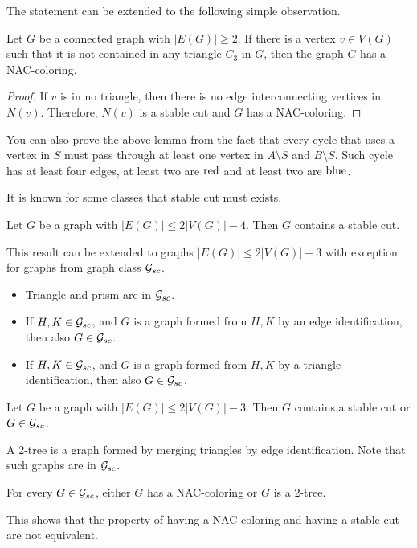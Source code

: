 The statement can be extended to the following simple observation.
%
\begin{corollary}
	Let \( G \) be a connected graph with \( |E(G)| \ge 2 \).
	If there is a vertex \( v \in V(G) \) such that it is
	not contained in any triangle \( C_3 \) in \( G \),
	then the graph \( G \) has a NAC-coloring.
\end{corollary}
%
\begin{proof}
	If \( v \) is in no triangle, then there is no edge interconnecting
	vertices in \( N(v) \). Therefore, \( N(v) \) is a stable cut and \( G \)
	has a NAC-coloring.
\end{proof}

You can also prove the above lemma from the fact that every cycle that
uses a vertex in \( S \) must pass
through at least one vertex in \( A \setminus S \) and \( B \setminus S \).
Such cycle has at least four edges,
at least two are \( \text{red} \) and at least two are \( \text{blue} \).

It is known for some classes that stable cut must exists.
%
\begin{theorem}
	Let \( G \) be a graph with \( |E(G)| \le 2|V(G)|-4 \).
	Then \( G \) contains a stable cut.
\end{theorem}
%
This result can be extended to graphs \( |E(G)| \le 2|V(G)|-3 \) with exception
for graphs from graph class \( \mathcal{G}_{sc} \).
%
\begin{itemize}
	\item Triangle and prism are in \( \mathcal{G}_{sc} \).
	\item If \( H, K \in \mathcal{G}_{sc} \), and \( G \) is a graph
	      formed from \( H, K \) by an edge identification,
	      then also \( G \in \mathcal{G}_{sc} \).
	\item If \( H, K \in \mathcal{G}_{sc} \), and \( G \) is a graph
	      formed from \( H, K \) by a triangle identification,
	      then also \( G \in \mathcal{G}_{sc} \).
\end{itemize}
%
%
\begin{theorem}
	Let \( G \) be a graph with \( |E(G)| \le 2|V(G)|-3 \). Then \( G \) contains
	a stable cut or \( G \in \mathcal{G}_{sc} \).
\end{theorem}
%
A 2-tree is a graph formed by merging triangles by edge identification.
Note that such graphs are in \( \mathcal{G}_{sc} \).
%
\begin{lemma}
	For every \( G \in \mathcal{G}_{sc} \), either \( G \) has a NAC-coloring
	or \( G \) is a 2-tree.
\end{lemma}
%
This shows that the property of having a NAC-coloring and having a stable cut
are not equivalent.

